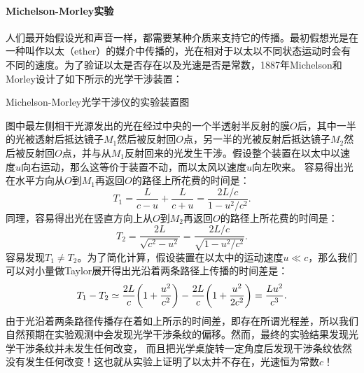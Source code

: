 \paragraph{Michelson-Morley实验}
人们最开始假设光和声音一样，都需要某种介质来支持它的传播。最初假想光是在一种叫作以太（ether）的媒介中传播的，光在相对于以太以不同状态运动时会有不同的速度。为了验证以太是否存在以及光速是否是常数，1887年Michelson和Morley设计了如下所示的光学干涉装置：
\begin{center}
	\tikzchap Michelson-Morley光学干涉仪的实验装置图
\end{center}
图中最左侧相干光源发出的光在经过中央的一个半透射半反射的膜$O$后，其中一半的光被透射后抵达镜子$M_1$然后被反射回$O$点，另一半的光被反射后抵达镜子$M_2$然后被反射回$O$点，并与从$M_1$反射回来的光发生干涉。假设整个装置在以太中以速度$u$向右运动，那么这等价于装置不动，而以太风以速度$u$向左吹来。%
容易得出光在水平方向从$O$到$M_1$再返回$O$的路径上所花费的时间是：
\[
	T_1=\frac L{c-u}+\frac L{c+u}=\frac{2L/c}{1-u^2/c^2}.
\]
同理，容易得出光在竖直方向上从$O$到$M_2$再返回$O$的路径上所花费的时间是：
\[
	T_2=\frac{2L}{\sqrt{c^2-u^2}}=\frac{2L/c}{\sqrt{1-u^2/c^2}}.
\]
容易发现$T_1\neq T_2$。为了简化计算，假设装置在以太中的运动速度$u\ll c$，那么我们可以对小量做Taylor展开得出光沿着两条路径上传播的时间差是：
\[
	T_1-T_2\simeq\frac{2L}c\biggl(1+\frac{u^2}{c^2}\biggr)-\frac{2L}c\biggl(1+\frac{u^2}{2c^2}\biggr)=\frac{Lu^2}{c^3}.
\]
由于光沿着两条路径传播存在着如上所示的时间差，即存在所谓光程差，所以我们自然预期在实验观测中会发现光学干涉条纹的偏移。然而，最终的实验结果发现光学干涉条纹并未发生任何改变，%
而且把光学桌旋转一定角度后发现干涉条纹依然没有发生任何改变！这也就从实验上证明了以太并不存在，光速恒为常数$c$！
